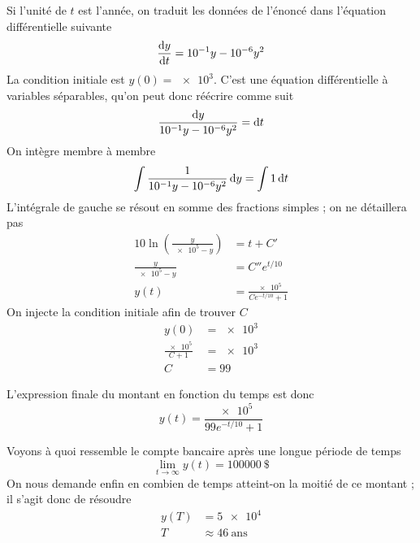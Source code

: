 \begin{solution}
    Si l'unité de $t$ est l'année, on traduit les données de l'énoncé dans l'équation différentielle suivante 
    \[ \frac{\operatorname{d}\! y}{\operatorname{d}\! t} = \num{e-1}y - \num{e-6} y^2 \]
    La condition initiale est $y(0) = \num{e3}$. C'est une équation différentielle à variables séparables, qu'on peut donc réécrire comme suit
    \[ \frac{\operatorname{d}\! y}{\num{e-1} y - \num{e-6} y^2} = \operatorname{d}\! t \]
    On intègre membre à membre
    \[ \int \frac{1}{\num{e-1} y - \num{e-6} y^2} \operatorname{d}\! y = \int 1 \operatorname{d}\! t \]
    L'intégrale de gauche se résout en somme des fractions simples ; on ne détaillera pas
    \begin{align*}
        10 \ln \left( \frac{y}{\num{e5} - y} \right) &= t + C' \\
        \frac{y}{\num{e5} - y} &= C''e^{t/10} \\
        y(t) &= \frac{\num{e5}}{Ce^{-t/10} + 1}
    \end{align*}
    On injecte la condition initiale afin de trouver $C$
    \begin{align*}
        y(0) &= \num{e3} \\
        \frac{\num{e5}}{C+1} &= \num{e3} \\
        C &= 99
    \end{align*}
        
    L'expression finale du montant en fonction du temps est donc
    \[ y(t) = \frac{\num{e5}}{99e^{-t/10} + 1} \]

    Voyons à quoi ressemble le compte bancaire après une longue période de temps 
    \[ \lim_{t \to \infty} y(t) = \SI{100000}{\$} \]
    On nous demande enfin en combien de temps atteint-on la moitié de ce montant ; il s'agit donc de résoudre
    \begin{align*}
        y(T) &= \num{5e4} \\
        T &\approx \SI{46}{\text{ans}}
    \end{align*}



\end{solution}



